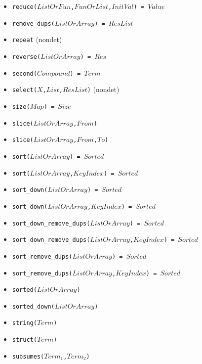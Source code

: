 \documentclass[10pt]{article}
\begin{document}
\begin{multicols}{2}
\begin{scriptsize}
\begin{itemize}
    \item \texttt{reduce($ListOrFun$,$FunOrList$,$InitVal$) = $Value$} 
    \item \texttt{remove\_dups($ListOrArray$) = $ResList$} 
    \item \texttt{repeat} (nondet)
    \item \texttt{reverse($ListOrArray$) = $Res$} 
    \item \texttt{second($Compound$) = $Term$} 
    \item \texttt{select($X$,$List$,$ResList$)} (nondet)
    \item \texttt{size($Map$) = $Size$}
    \item \texttt{slice($ListOrArray$,$From$)}
    \item \texttt{slice($ListOrArray$,$From$,$To$)}
    \item \texttt{sort($ListOrArray$) = $Sorted$} 
    \item \texttt{sort($ListOrArray$,$KeyIndex$) = $Sorted$} 
    \item \texttt{sort\_down($ListOrArray$) = $Sorted$} 
    \item \texttt{sort\_down($ListOrArray$,$KeyIndex$) = $Sorted$} 
    \item \texttt{sort\_down\_remove\_dups($ListOrArray$) = $Sorted$} 
    \item \texttt{sort\_down\_remove\_dups($ListOrArray$,$KeyIndex$) = $Sorted$} 
    \item \texttt{sort\_remove\_dups($ListOrArray$) = $Sorted$} 
    \item \texttt{sort\_remove\_dups($ListOrArray$,$KeyIndex$) = $Sorted$} 
    \item \texttt{sorted($ListOrArray$)} 
    \item \texttt{sorted\_down($ListOrArray$)} 
    \item \texttt{string($Term$)} 
    \item \texttt{struct($Term$)} 
    \item \texttt{subsumes($Term_1$,$Term_2$)}

\end{itemize}
\end{scriptsize}
\end{multicols}
\end{document}
